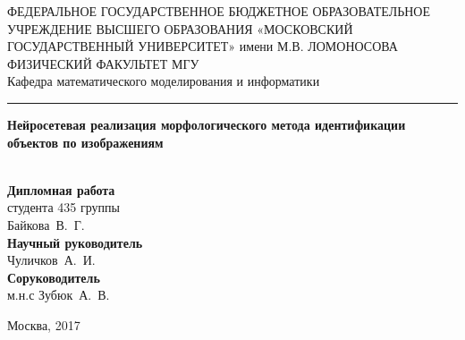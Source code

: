 \documentclass[a4paper, 12pt]{article}
\begin{document}
\begin{titlepage}

\begin{center}
\vfill

{\small ФЕДЕРАЛЬНОЕ ГОСУДАРСТВЕННОЕ БЮДЖЕТНОЕ ОБРАЗОВАТЕЛЬНОЕ 
УЧРЕЖДЕНИЕ ВЫСШЕГО ОБРАЗОВАНИЯ 
«МОСКОВСКИЙ ГОСУДАРСТВЕННЫЙ УНИВЕРСИТЕТ» имени М.В. ЛОМОНОСОВА
\ \\[1ex]
ФИЗИЧЕСКИЙ ФАКУЛЬТЕТ МГУ }
\ \\[0.8ex]
Кафедра математического моделирования и информатики
\ \\[1.8ex] 
\hrule 

\vfill

{\large\bf Нейросетевая реализация морфологического метода идентификации объектов по изображениям \\}
\ \\[2ex]
\begin{flushright}
\begin{minipage}{0.35\textwidth}
{\bf Дипломная работа}  \\ студента 435 группы \\ Байкова~В.~Г.
\\[1ex]
{\bf Научный руководитель} \\ Чуличков~А.~И.\\
{\bf Соруководитель} \\ м.н.с Зубюк~А.~В.
\end{minipage}
\end{flushright}

\vfill
\end{center}
\hspace{3em}\begin{minipage}{0.65\textwidth}
\end{minipage}

\vfill
\begin{center}
Москва, 2017
\end{center}

\end{titlepage}


\newpage
\pagestyle{empty}
\tableofcontents

\newpage
\pagestyle{plain}
\end{document}
